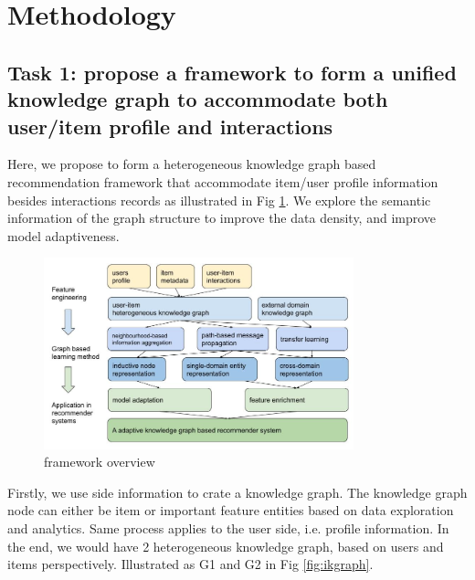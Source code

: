 


\section{Methodology}

\subsection*{Task 1: propose a framework to form a unified knowledge graph to accommodate both user/item profile and interactions}

Here, we propose to form a heterogeneous knowledge graph based recommendation framework that accommodate item/user profile information besides interactions records as illustrated in Fig \ref{fig:framework}. We explore the semantic information of the graph structure to improve the data density, and improve model adaptiveness.

\begin{figure}[!h]
    \centering
    \includegraphics[width=0.8\textwidth]{figs/framework_overview.jpg}
    \caption{framework overview}\label{fig:framework}
\end{figure}

Firstly, we use side information to crate a knowledge graph. The knowledge graph node can either be item or important feature entities based on data exploration and analytics. Same process applies to the user side, i.e. profile information. In the end, we would have 2 heterogeneous knowledge graph, based on users and items perspectively. Illustrated as G1 and G2 in Fig \ref{fig:ikgraph}.

